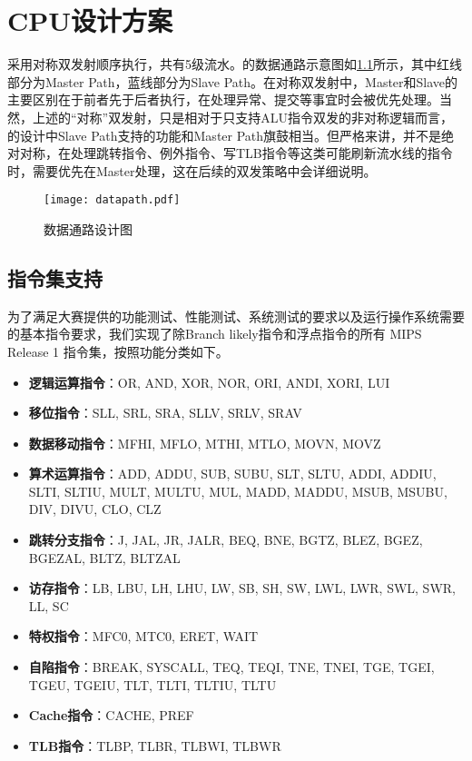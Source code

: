 \chapter{CPU设计方案}

\cpuname 采用对称双发射顺序执行，共有5级流水。\cpuname 的数据通路示意图如\ref{img:datapath}所示，其中红线部分为Master Path，蓝线部分为Slave Path。在对称双发射中，Master和Slave的主要区别在于前者先于后者执行，在处理异常、提交等事宜时会被优先处理。当然，上述的“对称”双发射，只是相对于只支持ALU指令双发的非对称逻辑而言，\cpuname 的设计中Slave Path支持的功能和Master Path旗鼓相当。但严格来讲，并不是绝对对称，在处理跳转指令、例外指令、写TLB指令等这类可能刷新流水线的指令时，需要优先在Master处理，这在后续的双发策略中会详细说明。

\begin{figure}[h]
    \centering
    \texttt{[image: datapath.pdf]}
    \caption{数据通路设计图}
    \label{img:datapath}
\end{figure}


\section{指令集支持}
为了满足大赛提供的功能测试、性能测试、系统测试的要求以及运行操作系统需要的基本指令要求，我们实现了除Branch likely指令和浮点指令的所有 MIPS Release 1 指令集，按照功能分类如下。
\begin{itemize}
    \item \textbf{逻辑运算指令}：OR, AND, XOR, NOR, ORI, ANDI, XORI, LUI
    \item \textbf{移位指令}：SLL, SRL, SRA, SLLV, SRLV, SRAV
    \item \textbf{数据移动指令}：MFHI, MFLO, MTHI, MTLO, MOVN, MOVZ
    \item \textbf{算术运算指令}：ADD, ADDU, SUB, SUBU, SLT, SLTU, ADDI, ADDIU, SLTI, SLTIU, MULT, MULTU, MUL, MADD, MADDU, MSUB, MSUBU, DIV, DIVU, CLO, CLZ
    \item \textbf{跳转分支指令}：J, JAL, JR, JALR, BEQ, BNE, BGTZ, BLEZ, BGEZ, BGEZAL, BLTZ, BLTZAL
    \item \textbf{访存指令}：LB, LBU, LH, LHU, LW, SB, SH, SW, LWL, LWR, SWL, SWR, LL, SC
    \item \textbf{特权指令}：MFC0, MTC0, ERET, WAIT
    \item \textbf{自陷指令}：BREAK, SYSCALL, TEQ, TEQI, TNE, TNEI, TGE, TGEI, TGEU, TGEIU, TLT, TLTI, TLTIU, TLTU
    \item \textbf{Cache指令}：CACHE, PREF
    \item \textbf{TLB指令}：TLBP, TLBR, TLBWI, TLBWR
\end{itemize}

